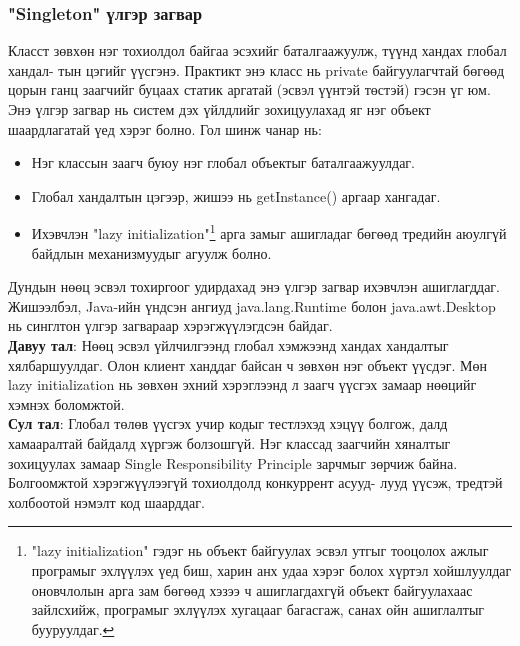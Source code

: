 \subsubsection{"Singleton" үлгэр загвар}
\quad \quad Класст зөвхөн нэг тохиолдол байгаа эсэхийг баталгаажуулж, түүнд хандах глобал хандал- тын цэгийг үүсгэнэ.
Практикт энэ класс нь private байгуулагчтай бөгөөд цорын ганц заагчийг буцаах статик аргатай (эсвэл үүнтэй төстэй) гэсэн үг юм. Энэ үлгэр загвар нь систем дэх үйлдлийг зохицуулахад яг нэг объект шаардлагатай үед хэрэг болно. Гол шинж чанар нь:
\begin{itemize}
	\item Нэг классын заагч буюу нэг глобал объектыг баталгаажуулдаг.
	\item Глобал хандалтын цэгээр, жишээ нь getInstance() аргаар хангадаг.
	\item Ихэвчлэн "lazy initialization"\footnote{"lazy initialization" гэдэг нь объект байгуулах эсвэл утгыг тооцолох ажлыг програмыг эхлүүлэх үед биш, харин анх удаа хэрэг болох хүртэл хойшлуулдаг оновчлолын арга зам бөгөөд хэзээ ч ашиглагдахгүй объект байгуулахаас зайлсхийж, програмыг эхлүүлэх хугацааг багасгаж, санах ойн ашиглалтыг бууруулдаг.} арга замыг ашигладаг бөгөөд тредийн аюулгүй байдлын механизмуудыг агуулж болно.
\end{itemize}
Дундын нөөц эсвэл тохиргоог удирдахад энэ үлгэр загвар ихэвчлэн ашиглагддаг. Жишээлбэл, Java-ийн үндсэн ангиуд java.lang.Runtime болон java.awt.Desktop нь синглтон үлгэр загвараар хэрэгжүүлэгдсэн байдаг. \\
\textbf{Давуу тал}: Нөөц эсвэл үйлчилгээнд глобал хэмжээнд хандах хандалтыг хялбаршуулдаг. Олон клиент ханддаг байсан ч зөвхөн нэг объект үүсдэг. Мөн lazy initialization нь зөвхөн эхний хэрэглээнд л заагч үүсгэх замаар нөөцийг хэмнэх боломжтой. \\
\textbf{Сул тал}: Глобал төлөв үүсгэх учир кодыг тестлэхэд хэцүү болгож, далд хамааралтай байдалд хүргэж болзошгүй. Нэг классад заагчийн хяналтыг зохицуулах замаар Single Responsibility Principle зарчмыг зөрчиж байна. Болгоомжтой хэрэгжүүлээгүй тохиолдолд конкуррент асууд- лууд үүсэж, тредтэй холбоотой нэмэлт код шаарддаг.

